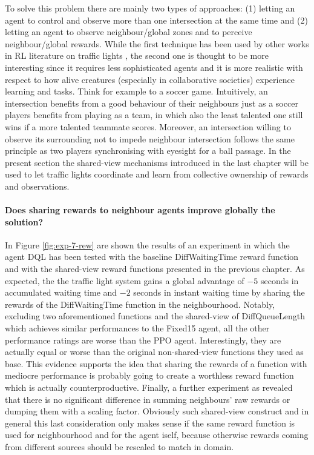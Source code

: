 To solve this problem there are mainly two types of approaches: (1) letting an agent to control and observe more than one intersection at the same time and (2) letting an agent to observe neighbour/global zones and to perceive neighbour/global rewards.
While the first technique has been used by other works in RL literature on traffic lights \cite{wei2019presslight}, the second one is thought to be more interesting since it requires less sophisticated agents and it is more realistic with respect to how alive creatures (especially in collaborative societies) experience learning and tasks. Think for example to a soccer game.
Intuitively, an intersection benefits from a good behaviour of their neighbours just as a soccer players benefits from playing as a team, in which also the least talented one still wins if a more talented teammate scores.
Moreover, an intersection willing to observe its surrounding not to impede neighbour intersection follows the same principle as two players synchronising with eyesight for a ball passage.
In the present section the shared-view mechanisms introduced in the last chapter will be used to let traffic lights coordinate and learn from collective ownership of rewards and observations.

\paragraph{Does sharing rewards to neighbour agents improve globally the solution?}

In Figure \ref{fig:exp-7-rew} are shown the results of an experiment in which the agent DQL has been tested with the baseline DiffWaitingTime reward function and with the shared-view reward functions presented in the previous chapter.
As expected, the the traffic light system gains a global advantage of $-5$ seconds in accumulated waiting time and $-2$ seconds in instant waiting time by sharing the rewards of the DiffWaitingTime function in the neighbourhood.
Notably, excluding two aforementioned functions and the shared-view of DiffQueueLength which achieves similar performances to the Fixed15 agent, all the other performance ratings are worse than the PPO agent.
Interestingly, they are actually equal or worse than the original non-shared-view functions they used as base.
This evidence supports the idea that sharing the rewards of a function with mediocre performance is probably going to create a worthless reward function which is actually counterproductive.
Finally, a further experiment as revealed that there is no significant difference in summing neighbours' raw rewards or dumping them with a scaling factor.
Obviously such shared-view construct and in general this last consideration only makes sense if the same reward function is used for neighbourhood and for the agent iself, because otherwise rewards coming from different sources should be rescaled to match in domain.


